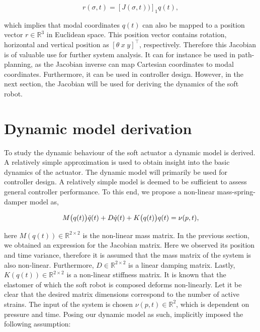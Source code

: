 \begin{equation}
    r(\sigma,t) = [J(\sigma,t))]_1q(t),
\end{equation}

which implies that modal coordinates $q(t)$ can also be mapped to a position vector $r\in \mathbb{R}^3$ in Euclidean space. This position vector contains rotation, horizontal and vertical position as $[\theta \hspace{3pt} x \hspace{3pt} y]^\top$, respectively. Therefore this Jacobian is of valuable use for further system analysis. It can for instance be used in path-planning, as the Jacobian inverse can map Cartesian coordinates to modal coordinates. Furthermore, it can be used in controller design. However, in the next section, the Jacobian will be used for deriving the dynamics of the soft robot. 


\section{Dynamic model derivation}


To study the dynamic behaviour of the soft actuator a dynamic model is derived. A relatively simple approximation is used to obtain insight into the basic dynamics of the actuator. The dynamic model will primarily be used for controller design. A relatively simple model is deemed to be sufficient to assess general controller performance. To this end, we propose a non-linear mass-spring-damper model as, 


\begin{equation}
    M\big(q(t)\big)\Ddot{q}(t) + D\dot{q}(t) + K\big(q(t)\big)q(t) = \nu(p,t),
    \label{eq2:simp_model}
\end{equation}


here $M(q(t)) \in \mathbb{R}^{2\times 2}$ is the non-linear mass matrix. In the previous section, we obtained an expression for the Jacobian matrix. Here we observed its position and time variance, therefore it is assumed that the mass matrix of the system is also non-linear. Furthermore, $D \in \mathbb{R}^{2\times2}$ is a linear damping matrix. Lastly, $K(q(t)) \in \mathbb{R}^{2\times 2}$ is a non-linear stiffness matrix. It is known that the elastomer of which the soft robot is composed deforms non-linearly. Let it be clear that the desired matrix dimensions correspond to the number of active strains. The input of the system is chosen $\nu(p,t) \in \mathbb{R}^2$, which is dependent on pressure and time. Posing our dynamic model as such, implicitly imposed the following assumption:

